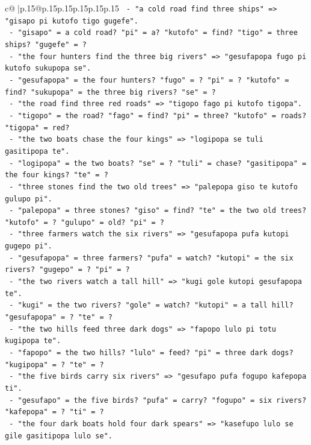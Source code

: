 \documentclass{article}
\begin{document}
{\begin{supertabular}{c@{$\;$}|p{.15\linewidth}@{}p{.15\linewidth}p{.15\linewidth}p{.15\linewidth}p{.15\linewidth}p{.15\linewidth}}
{{{\texttt{   {-} "a cold road find three ships" => "gisapo pi kutofo tigo gugefe".} \\
\texttt{   {-} "gisapo" = a cold road? "pi" = a? "kutofo" = find? "tigo" = three ships? "gugefe" = ?} \\
\texttt{   {-} "the four hunters find the three big rivers" => "gesufapopa fugo pi kutofo sukupopa se".} \\
\texttt{   {-} "gesufapopa" = the four hunters? "fugo" = ? "pi" = ? "kutofo" = find? "sukupopa" = the three big rivers? "se" = ?} \\
\texttt{   {-} "the road find three red roads" => "tigopo fago pi kutofo tigopa".} \\
\texttt{   {-} "tigopo" = the road? "fago" = find? "pi" = three? "kutofo" = roads? "tigopa" = red?} \\
\texttt{   {-} "the two boats chase the four kings" => "logipopa se tuli gasitipopa te".} \\
\texttt{   {-} "logipopa" = the two boats? "se" = ? "tuli" = chase? "gasitipopa" = the four kings? "te" = ?} \\
\texttt{   {-} "three stones find the two old trees" => "palepopa giso te kutofo gulupo pi".} \\
\texttt{   {-} "palepopa" = three stones? "giso" = find? "te" = the two old trees? "kutofo" = ? "gulupo" = old? "pi" = ?} \\
\texttt{   {-} "three farmers watch the six rivers" => "gesufapopa pufa kutopi gugepo pi".} \\
\texttt{   {-} "gesufapopa" = three farmers? "pufa" = watch? "kutopi" = the six rivers? "gugepo" = ? "pi" = ?} \\
\texttt{   {-} "the two rivers watch a tall hill" => "kugi gole kutopi gesufapopa te".} \\
\texttt{   {-} "kugi" = the two rivers? "gole" = watch? "kutopi" = a tall hill? "gesufapopa" = ? "te" = ?} \\
\texttt{   {-} "the two hills feed three dark dogs" => "fapopo lulo pi totu kugipopa te".} \\
\texttt{   {-} "fapopo" = the two hills? "lulo" = feed? "pi" = three dark dogs? "kugipopa" = ? "te" = ?} \\
\texttt{   {-} "the five birds carry six rivers" => "gesufapo pufa fogupo kafepopa ti".} \\
\texttt{   {-} "gesufapo" = the five birds? "pufa" = carry? "fogupo" = six rivers? "kafepopa" = ? "ti" = ?} \\
\texttt{   {-} "the four dark boats hold four dark spears" => "kasefupo lulo se gile gasitipopa lulo se".} \\
}}}
\end{supertabular}}
\end{document}

